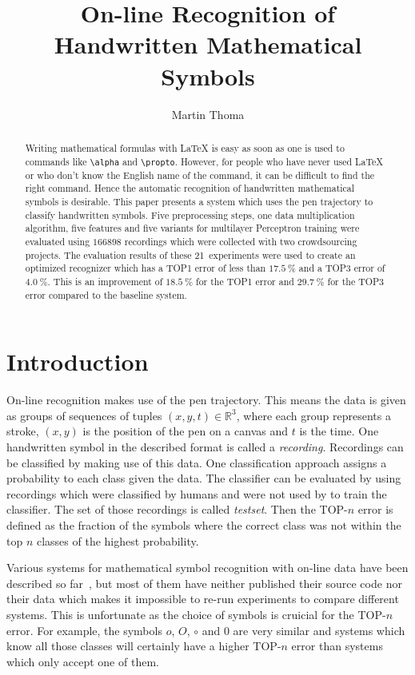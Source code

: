 \documentclass[9pt,technote]{IEEEtran}
\title{On-line Recognition of Handwritten Mathematical Symbols}
\author{Martin Thoma}
\begin{document}
\maketitle
\begin{abstract}
Writing mathematical formulas with \LaTeX{} is easy as soon as one is used to
commands like \verb+\alpha+ and \verb+\propto+. However, for people who have
never used \LaTeX{} or who don't know the English name of the command, it can
be difficult to find the right command. Hence the automatic recognition of
handwritten mathematical symbols is desirable. This paper presents a system
which uses the pen trajectory to classify handwritten symbols. Five
preprocessing steps, one data multiplication algorithm, five features and five
variants for multilayer Perceptron training were evaluated using $\num{166898}$
recordings which were collected with two crowdsourcing projects. The evaluation
results of these 21~experiments were used to create an optimized recognizer
which has a TOP1 error of less than $\SI{17.5}{\percent}$ and a TOP3 error of
$\SI{4.0}{\percent}$. This is an improvement of $\SI{18.5}{\percent}$ for the
TOP1 error and $\SI{29.7}{\percent}$ for the TOP3 error compared to the
baseline system.
\end{abstract}

\section{Introduction}
On-line recognition makes use of the pen trajectory. This means the data is
given as groups of sequences of tuples $(x, y, t) \in \mathbb{R}^3$, where
each group represents a stroke, $(x, y)$ is the position of the pen on a canvas
and $t$ is the time. One handwritten symbol in the described format is called
a \textit{recording}. Recordings can be classified by making use of
this data. One classification approach assigns a probability to each class
given the data. The classifier can be evaluated by using recordings which
were classified by humans and were not used by to train the classifier. The
set of those recordings is called \textit{testset}. Then
the TOP-$n$ error is defined as the fraction of the symbols where the correct
class was not within the top $n$ classes of the highest probability.

Various systems for mathematical symbol recognition with on-line data have been
described so far~\cite{Kosmala98,Mouchere2013}, but most of them have neither
published their source code nor their data which makes it impossible to re-run
experiments to compare different systems. This is unfortunate as the choice of
symbols is cruicial for the TOP-$n$ error. For example, the symbols $o$, $O$,
$\circ$ and $0$ are very similar and systems which know all those classes will
certainly have a higher TOP-$n$ error than systems which only accept one of
them.
\end{document}
